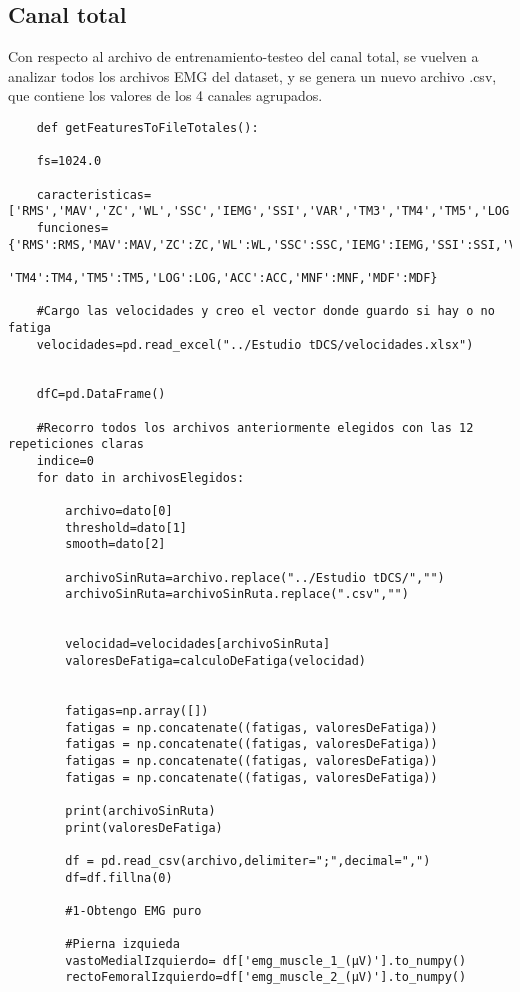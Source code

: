     \subsection{Canal total}
    Con respecto al archivo de entrenamiento-testeo del canal total, se vuelven a analizar todos los archivos EMG del dataset, y se genera un nuevo archivo .csv, que contiene los valores de los 4 canales agrupados.
    \begin{lstlisting}
    def getFeaturesToFileTotales():
    
    fs=1024.0
    
    caracteristicas=['RMS','MAV','ZC','WL','SSC','IEMG','SSI','VAR','TM3','TM4','TM5','LOG','ACC','MNF','MDF']
    funciones={'RMS':RMS,'MAV':MAV,'ZC':ZC,'WL':WL,'SSC':SSC,'IEMG':IEMG,'SSI':SSI,'VAR':VAR,'TM3':TM3,
               'TM4':TM4,'TM5':TM5,'LOG':LOG,'ACC':ACC,'MNF':MNF,'MDF':MDF}
       
    #Cargo las velocidades y creo el vector donde guardo si hay o no fatiga
    velocidades=pd.read_excel("../Estudio tDCS/velocidades.xlsx")
    
    
    dfC=pd.DataFrame()
    
    #Recorro todos los archivos anteriormente elegidos con las 12 repeticiones claras
    indice=0
    for dato in archivosElegidos:
        
        archivo=dato[0]
        threshold=dato[1]
        smooth=dato[2]
        
        archivoSinRuta=archivo.replace("../Estudio tDCS/","")
        archivoSinRuta=archivoSinRuta.replace(".csv","")
        
        
        velocidad=velocidades[archivoSinRuta]
        valoresDeFatiga=calculoDeFatiga(velocidad)
        
        
        fatigas=np.array([])
        fatigas = np.concatenate((fatigas, valoresDeFatiga))
        fatigas = np.concatenate((fatigas, valoresDeFatiga))
        fatigas = np.concatenate((fatigas, valoresDeFatiga))
        fatigas = np.concatenate((fatigas, valoresDeFatiga))
        
        print(archivoSinRuta)
        print(valoresDeFatiga)
        
        df = pd.read_csv(archivo,delimiter=";",decimal=",")
        df=df.fillna(0)

        #1-Obtengo EMG puro 
        
        #Pierna izquieda
        vastoMedialIzquierdo= df['emg_muscle_1_(µV)'].to_numpy()
        rectoFemoralIzquierdo=df['emg_muscle_2_(µV)'].to_numpy()


\end{lstlisting}
